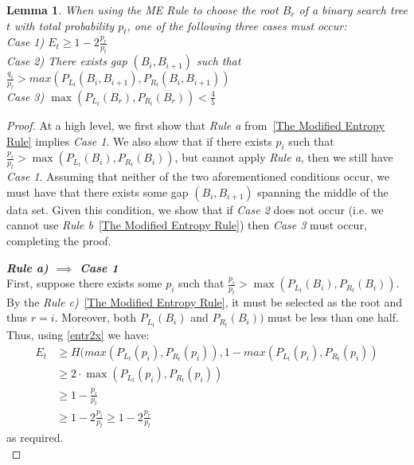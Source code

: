 \documentclass[letterpaper,12pt,titlepage,oneside,final]{book}
\theoremstyle{plain}
\newtheorem{lem}[thm]{Lemma}
\begin{document}
\begin{lem}\label{MECases}
When using the ME Rule to choose the root $B_r$ of a binary search tree $t$ with total probability $p_t$, one of the following three cases must occur: \\
\textit{Case 1)} $E_t \geq 1-2 \frac{p_r}{p_t}$ \\
\textit{Case 2)} There exists gap $(B_i, B_{i+1})$ such that $\frac{q_i}{p_t} > max(P_{L_t}(B_i, B_{i+1}), P_{R_t}(B_i, B_{i+1}))$\\
\textit{Case 3)}  $\max(P_{L_t}(B_r), P_{R_t}(B_r)) < \frac{4}{5}$\\
\end{lem}
\begin{proof} At a high level, we first show that \textit{Rule a} from~\ref{The Modified Entropy Rule} implies \textit{Case 1}. We also show that if there exists $p_i$ such that $\frac{p_i}{p_t} > \max(P_{L_t}(B_i), P_{R_t}(B_i))$, but cannot apply \textit{Rule a}, then we still have \textit{Case 1}. Assuming that neither of the two aforementioned conditions occur, we must have that there exists some gap $(B_i, B_{i+1})$ spanning the middle of the data set. Given this condition, we show that if \textit{Case 2} does not occur (i.e. we cannot use \textit{Rule b}~\ref{The Modified Entropy Rule}) then \textit{Case 3} must occur, completing the proof. 


\noindent\textbf{\textit{Rule a) $\implies$ Case 1}} \\
 First, suppose there exists some $p_i$ such that $\frac{p_i}{p_t} > \max(P_{L_t}(B_i), P_{R_t}(B_i))$. By the \textit{Rule c)}~\ref{The Modified Entropy Rule}, it must be selected as the root and thus $r=i$. Moreover, both $P_{L_t}(B_i)$ and $P_{R_t}(B_i))$ must be less than one half. Thus, using \ref{entr2x} we have: 
\begin{align*}
E_t &\geq H( max(P_{L_t}(p_i), P_{R_t}(p_i)), 1-max(P_{L_t}(p_i), P_{R_t}(p_i)) \\
 &\geq 2\cdot \max(P_{L_t}(p_i), P_{R_t}(p_i)) \\  &\geq 1-\frac{p_i}{p_t} \\ 
 &\geq 1-2 \frac{p_i}{p_t} \geq 1-2 \frac{p_r}{p_t} 
\end{align*}
 as required. \\
 

\end{proof}
\end{document}
